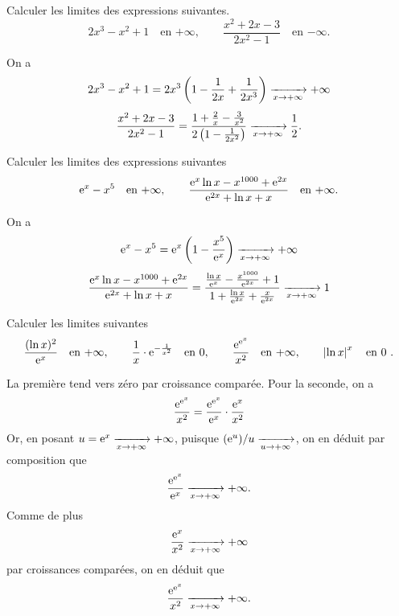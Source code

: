 \documentclass{magnolia}
\begin{document}
\begin{exos}
\exo Calculer les limites des expressions suivantes.
  \[2x^3-x^2+1 \quad\text{en $+\infty$}, \qquad
    \frac{x^2+2x-3}{2x^2-1} \quad\text{en $-\infty$}.\]
    \begin{sol}
    On a
    \[2x^3-x^2+1=2x^3\left(1-\frac{1}{2x}+\frac{1}{2x^{3}} \right)\xrightarrow[x\rightarrow +\infty]{}+\infty\]
    \[\frac{x^2+2x-3}{2x^2-1}=\frac{1+\frac{2}{x}-\frac{3}{x^{2}}}{2\left( 1-\frac{1}{2x^{2}}\right) }\xrightarrow[x\rightarrow +\infty]{}\frac{1}{2}.\]
    \end{sol}
\exo Calculer les limites des expressions suivantes
  \[{\rm e}^x-x^5 \quad\text{en $+\infty$}, \qquad
    \frac{{\rm e}^x\ln x-x^{1000}+{\rm e}^{2x}}{{\rm e}^{2x}+\ln x+x}
    \quad\text{en $+\infty$}.\]
    \begin{sol}
    On a
\[{\rm e}^x-x^5={\rm e}^x\left( 1-\frac{x^5}{{\rm e}^{x}}\right)\xrightarrow[x\rightarrow +\infty]{} +\infty\]
\[\frac{{\rm e}^x\ln x-x^{1000}+{\rm e}^{2x}}{{\rm e}^{2x}+\ln x+x} = \frac{\frac{\ln x}{{\rm e}^{x}}-\frac{x^{1000}}{{\rm e}^{2x}}+1}{1+\frac{\ln x}{{\rm e}^{2x}}+\frac{x}{{\rm e}^{2x}}}\xrightarrow[x\rightarrow +\infty]{} 1\]
    \end{sol}
\exo Calculer les limites suivantes
\[\frac{(\ln x)^2}{{\rm e}^x} \quad \text{en $+\infty$}, \qquad
  \frac{1}{x}\cdot {\rm e}^{-\frac{1}{x^2}} \quad \text{en 0}, \qquad
  \frac{{\rm e}^{{\rm e}^x}}{x^2} \quad\text{en $+\infty$}, \qquad
  \left|\ln x\right|^x \quad \text{en 0 .}\]
  \begin{sol}
    La première tend vers zéro par croissance comparée. Pour la seconde, on a
    \[\frac{{\rm e}^{{\rm e}^x}}{x^2}=\frac{{\rm e}^{{\rm e}^x}}{{\rm e}^x}\cdot\frac{{\rm e}^x}{x^2}\]
    Or, en posant $u={\rm e}^x\xrightarrow[x\rightarrow +\infty]{}+\infty$, puisque $({\rm e}^u)/u\xrightarrow[u\rightarrow +\infty]{}$, on en déduit par composition que
    \[\frac{{\rm e}^{{\rm e}^x}}{{\rm e}^x}\xrightarrow[x\rightarrow +\infty]{}+\infty.\]
    Comme de plus
    \[\frac{{\rm e}^x}{x^2}\xrightarrow[x\rightarrow +\infty]{}+\infty\]
    par croissances comparées, on en déduit que
    \[\frac{{\rm e}^{{\rm e}^x}}{x^2}\xrightarrow[x\rightarrow +\infty]{}+\infty.\]
        \end{sol}
\end{exos}
\end{document}
